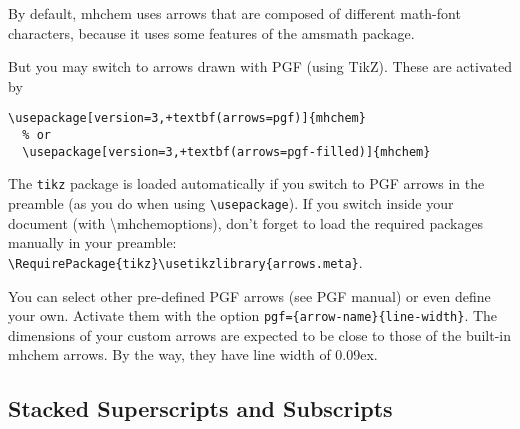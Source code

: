 \documentclass[a4paper,notitlepage,parskip=half]{scrreprt}
\newcommand\macro[1]{{\ttfamily\textbackslash#1}}
\begin{document}
By default, mhchem uses arrows that are composed of different math-font characters, because it uses some features of the amsmath package.

\begin{SideBySideExample}[xrightmargin=3cm]
\end{SideBySideExample}

But you may switch to arrows drawn with PGF (using TikZ). These are activated by

\begin{Verbatim}[commandchars=+()]
  \usepackage[version=3,+textbf(arrows=pgf)]{mhchem}
  % or
  \usepackage[version=3,+textbf(arrows=pgf-filled)]{mhchem}
\end{Verbatim}

The \verb|tikz| package is loaded automatically if you switch to PGF arrows in the preamble (as you do when using \verb|\usepackage|). If you switch inside your document (with \macro{mhchemoptions}), don't forget to load the required packages manually in your preamble: \verb|\RequirePackage{tikz}\usetikzlibrary{arrows.meta}|.

\begin{SideBySideExample}[xrightmargin=3cm]
\end{SideBySideExample}

\begin{SideBySideExample}[xrightmargin=3cm]
\end{SideBySideExample}

You can select other pre-defined PGF arrows (see PGF manual) or even define your own. Activate them with the option \verb|pgf={arrow-name}{line-width}|. The dimensions of your custom arrows are expected to be close to those of the built-in mhchem arrows. By the way, they have line width of 0.09ex.

\begin{SideBySideExample}[xrightmargin=3cm]
\end{SideBySideExample}


\subsection{Stacked Superscripts and Subscripts}

\begin{SideBySideExample}[xrightmargin=3cm]
\end{SideBySideExample}
\end{document}

